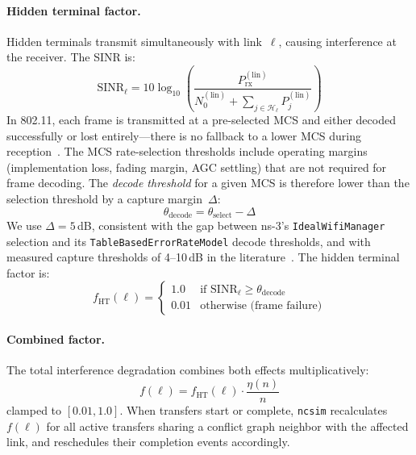 \documentclass[conference]{IEEEtran}
\newcommand{\ncsim}{\texttt{ncsim}}
\begin{document}
\paragraph{Hidden terminal factor.}
Hidden terminals transmit simultaneously with link~$\ell$, causing
interference at the receiver.  The SINR is:
\begin{equation}
\text{SINR}_\ell = 10\log_{10}\!\left(\frac{P_\text{rx}^{(\text{lin})}}{N_0^{(\text{lin})} + \sum_{j \in \mathcal{H}_\ell} P_j^{(\text{lin})}}\right)
\label{eq:sinr}
\end{equation}
In 802.11, each frame is transmitted at a pre-selected MCS and either
decoded successfully or lost entirely---there is no fallback to a lower
MCS during reception~\cite{daneshgaran2008,zorzi1994}.  The MCS
rate-selection thresholds include operating margins (implementation loss,
fading margin, AGC settling) that are not required for frame decoding.
The \emph{decode threshold} for a given MCS is therefore lower than the
selection threshold by a capture margin~$\Delta$:
\begin{equation}
\theta_\text{decode} = \theta_\text{select} - \Delta
\label{eq:capture}
\end{equation}
We use $\Delta = 5$\,dB, consistent with the gap between ns-3's
\texttt{IdealWifiManager} selection and its \texttt{TableBasedErrorRateModel}
decode thresholds, and with measured capture thresholds of 4--10\,dB in the
literature~\cite{hadzivelkov2002}.  The hidden terminal factor is:
\begin{equation}
f_\text{HT}(\ell) = \begin{cases}
1.0 & \text{if } \text{SINR}_\ell \geq \theta_\text{decode} \\
0.01 & \text{otherwise (frame failure)}
\end{cases}
\label{eq:sinr_factor}
\end{equation}

\paragraph{Combined factor.}
The total interference degradation combines both effects multiplicatively:
\begin{equation}
\boxed{f(\ell) = f_\text{HT}(\ell) \cdot \frac{\eta(n)}{n}}
\label{eq:combined}
\end{equation}
clamped to $[0.01, 1.0]$.  When transfers start or complete, \ncsim{}
recalculates $f(\ell)$ for all active transfers sharing a conflict graph
neighbor with the affected link, and reschedules their completion events
accordingly.
\end{document}
